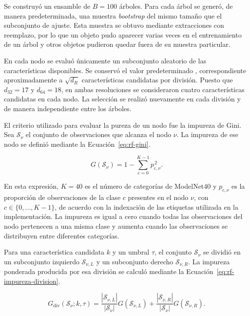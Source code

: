 Se construyó un ensamble de $B=100$ árboles. Para cada árbol se generó, de manera predeterminada, una muestra \textit{bootstrap} del mismo tamaño que el subconjunto de ajuste. Esta muestra se obtuvo mediante extracciones con reemplazo, por lo que un objeto pudo aparecer varias veces en el entrenamiento de un árbol y otros objetos pudieron quedar fuera de su muestra particular.

En cada nodo se evaluó únicamente un subconjunto aleatorio de las características disponibles. Se conservó el valor predeterminado \protect{}, correspondiente aproximadamente a $\sqrt{d_R}$ características candidatas por división. Puesto que $d_{32}=17$ y $d_{64}=18$, en ambas resoluciones se consideraron cuatro características candidatas en cada nodo. La selección se realizó nuevamente en cada división y de manera independiente entre los árboles.

El criterio utilizado para evaluar la pureza de un nodo fue la impureza de Gini. Sea $\mathcal S_\nu$ el conjunto de observaciones que alcanza el nodo $\nu$. La impureza de ese nodo se definió mediante la Ecuación~\eqref{eq:rf-gini}.

\begin{equation}
G(\mathcal S_\nu)
=
1-
\sum_{c=0}^{K-1}
p_{c,\nu}^{\,2}.
\label{eq:rf-gini}
\end{equation}

En esta expresión, $K=40$ es el número de categorías de ModelNet40 y $p_{c,\nu}$ es la proporción de observaciones de la clase $c$ presentes en el nodo $\nu$, con $c\in\{0,\ldots,K-1\}$, de acuerdo con la indexación de las etiquetas utilizada en la implementación. La impureza es igual a cero cuando todas las observaciones del nodo pertenecen a una misma clase y aumenta cuando las observaciones se distribuyen entre diferentes categorías.

Para una característica candidata $k$ y un umbral $\tau$, el conjunto $\mathcal S_\nu$ se dividió en un subconjunto izquierdo $\mathcal S_{\nu,L}$ y un subconjunto derecho $\mathcal S_{\nu,R}$. La impureza ponderada producida por esa división se calculó mediante la Ecuación~\eqref{eq:rf-impureza-division}.

\begin{equation}
G_{\mathrm{div}}
\left(
\mathcal S_\nu;k,\tau
\right)
=
\frac{|\mathcal S_{\nu,L}|}{|\mathcal S_\nu|}
G(\mathcal S_{\nu,L})
+
\frac{|\mathcal S_{\nu,R}|}{|\mathcal S_\nu|}
G(\mathcal S_{\nu,R}).
\label{eq:rf-impureza-division}
\end{equation}


